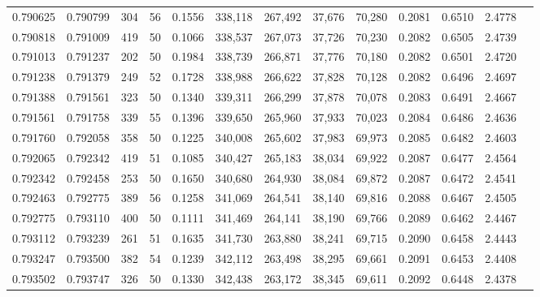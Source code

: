 \begin{tabular}{rrrrrrrrrrrrr}
0.790625 & 0.790799 &   304 &  56 &                                     0.1556 & 338,118 & 267,492 &  37,676 &  70,280 & 0.2081 & 0.6510 & 2.4778 \\
0.790818 & 0.791009 &   419 &  50 &                                     0.1066 & 338,537 & 267,073 &  37,726 &  70,230 & 0.2082 & 0.6505 & 2.4739 \\
0.791013 & 0.791237 &   202 &  50 &                                     0.1984 & 338,739 & 266,871 &  37,776 &  70,180 & 0.2082 & 0.6501 & 2.4720 \\
0.791238 & 0.791379 &   249 &  52 &                                     0.1728 & 338,988 & 266,622 &  37,828 &  70,128 & 0.2082 & 0.6496 & 2.4697 \\
0.791388 & 0.791561 &   323 &  50 &                                     0.1340 & 339,311 & 266,299 &  37,878 &  70,078 & 0.2083 & 0.6491 & 2.4667 \\
0.791561 & 0.791758 &   339 &  55 &                                     0.1396 & 339,650 & 265,960 &  37,933 &  70,023 & 0.2084 & 0.6486 & 2.4636 \\
0.791760 & 0.792058 &   358 &  50 &                                     0.1225 & 340,008 & 265,602 &  37,983 &  69,973 & 0.2085 & 0.6482 & 2.4603 \\
0.792065 & 0.792342 &   419 &  51 &                                     0.1085 & 340,427 & 265,183 &  38,034 &  69,922 & 0.2087 & 0.6477 & 2.4564 \\
0.792342 & 0.792458 &   253 &  50 &                                     0.1650 & 340,680 & 264,930 &  38,084 &  69,872 & 0.2087 & 0.6472 & 2.4541 \\
0.792463 & 0.792775 &   389 &  56 &                                     0.1258 & 341,069 & 264,541 &  38,140 &  69,816 & 0.2088 & 0.6467 & 2.4505 \\
0.792775 & 0.793110 &   400 &  50 &                                     0.1111 & 341,469 & 264,141 &  38,190 &  69,766 & 0.2089 & 0.6462 & 2.4467 \\
0.793112 & 0.793239 &   261 &  51 &                                     0.1635 & 341,730 & 263,880 &  38,241 &  69,715 & 0.2090 & 0.6458 & 2.4443 \\
0.793247 & 0.793500 &   382 &  54 &                                     0.1239 & 342,112 & 263,498 &  38,295 &  69,661 & 0.2091 & 0.6453 & 2.4408 \\
0.793502 & 0.793747 &   326 &  50 &                                     0.1330 & 342,438 & 263,172 &  38,345 &  69,611 & 0.2092 & 0.6448 & 2.4378 \\

\end{tabular}
